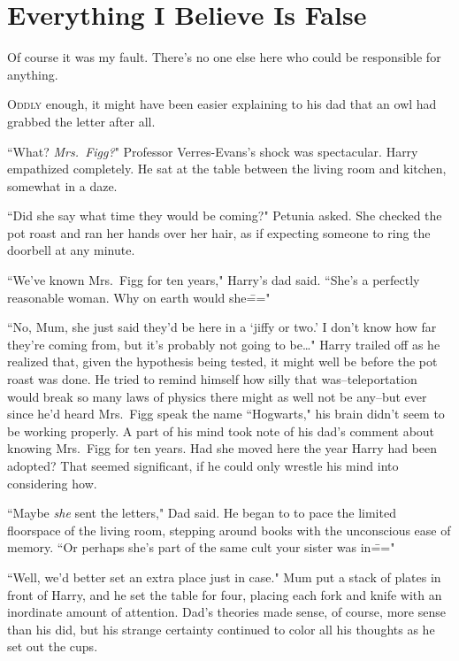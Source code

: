 \chapter{Everything I Believe Is False}

\begin{chapterOpeningQuote}
Of course it was my fault. There's no one else here who could be responsible for anything.
\end{chapterOpeningQuote}

\lettrine{O}{ddly} enough, it might have been easier explaining to his dad that an owl had grabbed the letter after all.

``What? \emph{Mrs.~Figg?}" Professor Verres-Evans's shock was spectacular. Harry empathized completely. He sat at the table between the living room and kitchen, somewhat in a daze.

``Did she say what time they would be coming?" Petunia asked. She checked the pot roast and ran her hands over her hair, as if expecting someone to ring the doorbell at any minute.

``We've known Mrs.~Figg for ten years," Harry's dad said. ``She's a perfectly reasonable woman. Why on earth would she\==="

``No, Mum, she just said they'd be here in a `jiffy or two.' I don't know how far they're coming from, but it's probably not going to be{\ldots}" Harry trailed off as he realized that, given the hypothesis being tested, it might well be before the pot roast was done. He tried to remind himself how silly that was\---teleportation would break so many laws of physics there might as well not be any\---but ever since he'd heard Mrs.~Figg speak the name ``Hogwarts," his brain didn't seem to be working properly. A part of his mind took note of his dad's comment about knowing Mrs.~Figg for ten years. Had she moved here the year Harry had been adopted? That seemed significant, if he could only wrestle his mind into considering how.

``Maybe \emph{she} sent the letters," Dad said. He began to to pace the limited floorspace of the living room, stepping around books with the unconscious ease of memory. ``Or perhaps she's part of the same cult your sister was in\==="

``Well, we'd better set an extra place just in case." Mum put a stack of plates in front of Harry, and he set the table for four, placing each fork and knife with an inordinate amount of attention. Dad's theories made sense, of course, more sense than his did, but his strange certainty continued to color all his thoughts as he set out the cups.

